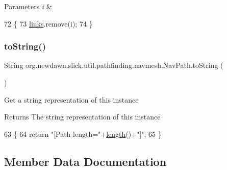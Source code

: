 \begin{DoxyParams}{Parameters}
{\em i} & \\
\hline
\end{DoxyParams}

\begin{DoxyCode}
72                               \{
73         \mbox{\hyperlink{classorg_1_1newdawn_1_1slick_1_1util_1_1pathfinding_1_1navmesh_1_1_nav_path_aa79523223a18486178fbb21fe550f253}{links}}.remove(i);
74     \}
\end{DoxyCode}
\mbox{\label{classorg_1_1newdawn_1_1slick_1_1util_1_1pathfinding_1_1navmesh_1_1_nav_path_a77930ab81227498f028e0dd3c67be8c2}} 
\subsubsection{\texorpdfstring{to\+String()}{toString()}}
{\footnotesize\ttfamily String org.\+newdawn.\+slick.\+util.\+pathfinding.\+navmesh.\+Nav\+Path.\+to\+String (\begin{DoxyParamCaption}{ }\end{DoxyParamCaption})\hspace{0.3cm}{\ttfamily [inline]}}

Get a string representation of this instance

\begin{DoxyReturn}{Returns}
The string representation of this instance 
\end{DoxyReturn}

\begin{DoxyCode}
63                              \{
64         \textcolor{keywordflow}{return} \textcolor{stringliteral}{"[Path length="}+\mbox{\hyperlink{classorg_1_1newdawn_1_1slick_1_1util_1_1pathfinding_1_1navmesh_1_1_nav_path_a57379bacf5476fb52e7f42d4565f37ac}{length}}()+\textcolor{stringliteral}{"]"};
65     \}
\end{DoxyCode}


\subsection{Member Data Documentation}
\mbox{\label{classorg_1_1newdawn_1_1slick_1_1util_1_1pathfinding_1_1navmesh_1_1_nav_path_aa79523223a18486178fbb21fe550f253}} 

